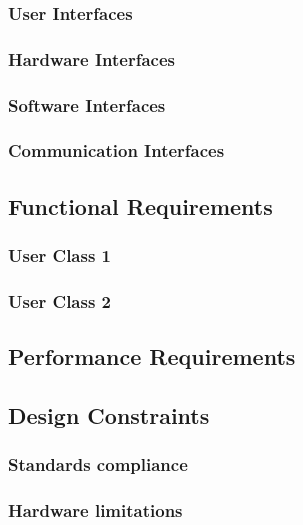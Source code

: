 \documentclass[a4paper,11pt]{report} %
\begin{document}
	\subsubsection{User Interfaces}
	
	\subsubsection{Hardware Interfaces}
	
	\subsubsection{Software Interfaces}
	
	\subsubsection{Communication Interfaces}
	
	\subsection{Functional Requirements}
	
	\subsubsection{User Class 1}
	
	\subsubsection{User Class 2}
	
	\subsection{Performance Requirements}
	
	\subsection{Design Constraints}
	
	\subsubsection{Standards compliance}
	
	\subsubsection{Hardware limitations}
	
\end{document}
